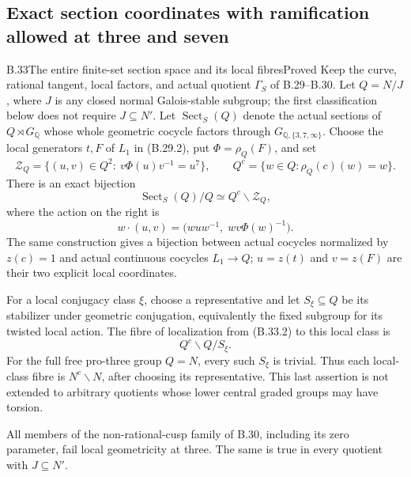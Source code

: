 \subsection{Exact section coordinates with ramification allowed at three and seven}

\begin{statement}{B.33}{The entire finite-set section space and its local fibres}{Proved}
Keep the curve, rational tangent, local factors, and actual
quotient $\Gamma_S$ of B.29--B.30.  Let $Q=N/J$, where
$J$ is any closed normal Galois-stable subgroup; the first
classification below does not require $J\subseteq N'$.
Let $\operatorname{Sect}_S(Q)$ denote the actual sections
of $Q\rtimes G_{\mathbb Q}$ whose whole geometric cocycle
factors through $G_{\mathbb Q,\{3,7,\infty\}}$.
Choose the local generators $t,F$ of $L_1$ in (B.29.2),
put $\Phi=\rho_Q(F)$, and set
\[
 \mathcal Z_Q=
 \{(u,v)\in Q^2:\ v\Phi(u)v^{-1}=u^7\},\qquad
 Q^c=\{w\in Q:\rho_Q(c)(w)=w\}.                              \tag{B.33.1}
\]
There is an exact bijection
\[
        \operatorname{Sect}_S(Q)/Q
             \simeq Q^c\backslash\mathcal Z_Q,                \tag{B.33.2}
\]
where the action on the right is
\[
       w\cdot(u,v)=
       \bigl(wuw^{-1},\;wv\Phi(w)^{-1}\bigr).
                                                               \tag{B.33.3}
\]
The same construction gives a bijection between actual
cocycles normalized by $z(c)=1$ and actual continuous
cocycles $L_1\to Q$; $u=z(t)$ and $v=z(F)$ are their
two explicit local coordinates.

For a local conjugacy class $\xi$, choose a representative
and let $S_\xi\subseteq Q$ be its stabilizer under geometric
conjugation, equivalently the fixed subgroup for its
twisted local action.  The fibre of localization from
(B.33.2) to this local class is
\[
                         Q^c\backslash Q/S_\xi.              \tag{B.33.4}
\]
For the full free pro-three group $Q=N$, every such
$S_\xi$ is trivial.  Thus each local-class fibre is
$N^c\backslash N$, after choosing its representative.
This last assertion is not extended to arbitrary quotients
whose lower central graded groups may have torsion.

All members of the non-rational-cusp family of B.30,
including its zero parameter, fail local geometricity
at three.  The same is true in every quotient with
$J\subseteq N'$.
\end{statement}
